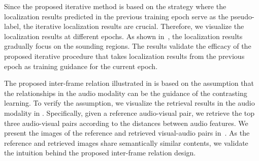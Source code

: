 




Since the proposed iterative method is based on the strategy where the localization results predicted in the previous training epoch serve as the pseudo-label, the iterative localization results are crucial.
%
Therefore, we visualize the localization results at different epochs. 
% 
% 
As shown in~, the localization results gradually focus on the sounding regions.
The results validate the efficacy of the proposed iterative procedure that takes localization results from the previous epoch as training guidance for the current epoch.



The proposed inter-frame relation illustrated in  is based on the assumption that the relationships in the audio modality can be the guidance of the contrasting learning.
%
To verify the assumption, we visualize the retrieval results in the audio modality in .
%
Specifically, given a reference audio-visual pair, we retrieve the top three audio-visual pairs according to the distances between audio features.
%
We present the images of the reference and retrieved visual-audio pairs in~.
%
%
As the reference and retrieved images share semantically similar contents, we validate the intuition behind the proposed inter-frame relation design.
% 
% 
% 
% 
% 











